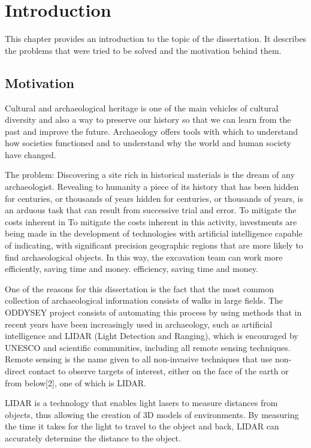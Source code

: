

\chapter{Introduction}
\label{chapter:introduction}

This chapter provides an introduction to the topic of the dissertation. It describes the problems that were tried to be solved and the motivation behind them.
\section{Motivation}
Cultural and archaeological heritage is one of the main vehicles of cultural diversity and also a way to preserve our history so that we can learn from the past and improve the future. Archaeology offers tools with which to understand how societies functioned and to understand why the world and human society have changed.

The problem: 
Discovering a site rich in historical materials is the dream of any archaeologist. Revealing to humanity a piece of its history that has been hidden for centuries, or thousands of years
hidden for centuries, or thousands of years, is an arduous task that can result from successive trial and error. To mitigate the costs inherent in 
To mitigate the costs inherent in this activity, investments are being made in the development of technologies with artificial intelligence capable of indicating, with significant precision
geographic regions that are more likely to find archaeological objects. In this way, the excavation team can work more efficiently, saving time and money.
efficiency, saving time and money.

One of the reasons for this dissertation is the fact that the most common collection of archaeological information consists of walks in large fields. The ODDYSEY project consists of automating this process by using methods that in recent years have been increasingly used in archaeology, such as artificial intelligence and LIDAR (Light Detection and Ranging), which is encouraged by UNESCO and scientific communities\cite{asmr}, including all remote sensing techniques.
Remote sensing is the name given to all non-invasive techniques that use non-direct contact to observe targets of interest, either on the face of the earth or from below[2], one of which is LIDAR.

LIDAR is a technology that enables light lasers to measure distances from objects, thus allowing the creation of 3D models of environments. By measuring the time it takes for the light to travel to the object and back, LIDAR can accurately determine the distance to the object.

